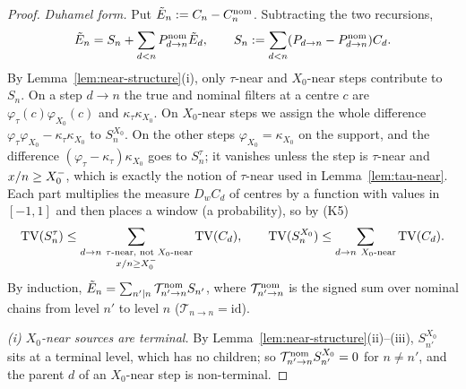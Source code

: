 \begin{proof}
\emph{Duhamel form.} Put $\tilde E_n:=C_n-C_n^{\mathrm{nom}}$. Subtracting the two recursions,
\[
  \tilde E_n=S_n+\sum_{d<n}P^{\mathrm{nom}}_{d\to n}\tilde E_d,\qquad S_n:=\sum_{d<n}(P_{d\to n}-P^{\mathrm{nom}}_{d\to n})C_d .
\]
By Lemma~\ref{lem:near-structure}(i), only $\tau$-near and $X_0$-near steps contribute to $S_n$. On a step $d\to n$ the true
and nominal filters at a centre $c$ are $\varphi_\tau(c)\varphi_{X_0}(c)$ and $\kappa_\tau\kappa_{X_0}$. On $X_0$-near steps we
assign the whole difference $\varphi_\tau\varphi_{X_0}-\kappa_\tau\kappa_{X_0}$ to $S^{X_0}_n$. On the other steps
$\varphi_{X_0}=\kappa_{X_0}$ on the support, and the difference $(\varphi_\tau-\kappa_\tau)\kappa_{X_0}$ goes to $S^\tau_n$; it vanishes
unless the step is $\tau$-near and $x/n\ge X_0^{-}$, which is exactly the notion of $\tau$-near used in Lemma~\ref{lem:tau-near}.
Each part multiplies the measure $D_wC_d$ of centres by a function with values in $[-1,1]$ and then places a window (a
probability), so by (K5)
\[
  \TV(S_n^\tau)\le\sum_{\substack{d\to n\ \tau\text{-near, not }X_0\text{-near}\\ x/n\ge\Xm}}\TV(C_d),\qquad \TV(S_n^{X_0})\le\sum_{d\to n\ X_0\text{-near}}\TV(C_d).
\]
By induction, $\tilde E_n=\sum_{n'\mid n}\mathcal T^{\mathrm{nom}}_{n'\to n}S_{n'}$, where $\mathcal T^{\mathrm{nom}}_{n'\to n}$ is the signed sum
over nominal chains from level $n'$ to level $n$ ($\mathcal T_{n\to n}=\mathrm{id}$).

\emph{(i) $X_0$-near sources are terminal.} By Lemma~\ref{lem:near-structure}(ii)--(iii), $S^{X_0}_{n'}$ sits at a terminal level,
which has no children; so $\mathcal T^{\mathrm{nom}}_{n'\to n}S^{X_0}_{n'}=0$ for $n\ne n'$, and the parent $d$ of an $X_0$-near step is
non-terminal.


\end{proof}
